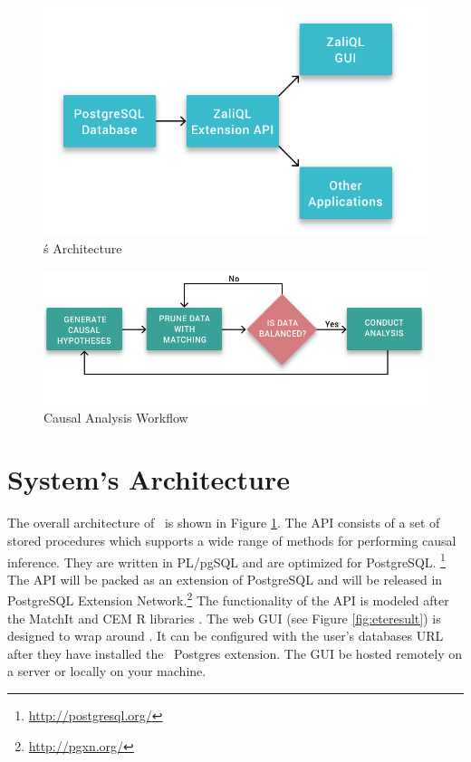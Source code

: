 
\begin{figure}
 \includegraphics[scale=0.25]{Figures/System-Overview.png}
 \caption{\GSQLB\'s Architecture}
  \label{fig:arch}
  \vspace{-3mm}
\end{figure}


\begin{figure}
  \includegraphics[scale=0.25]{Figures/Matching-Flowchart.png}
\caption{Causal Analysis Workflow }
\label{fig:flowchart}
\vspace{-0.3cm}
\end{figure}



\section{System's Architecture}

The overall architecture of \GSQL\ is shown in Figure \ref{fig:arch}.
The API consists of a set of stored procedures which supports a wide range of methods for performing causal inference.  They are written in PL/pgSQL and are optimized for PostgreSQL. \footnote{\url{http://postgresql.org/}}
The API will be packed  as an extension of  PostgreSQL and will be released in
PostgreSQL Extension Network.\footnote{\url{http://pgxn.org/}}
The functionality of the API is modeled after the MatchIt and CEM R libraries \cite{ho2005,iacus2009cem}. The web GUI (see Figure \ref{fig:eteresult}) is designed to wrap around \GSQL. It can be configured with the user's databases URL after they have installed the \GSQL\ Postgres extension. The  GUI be hosted remotely on a server or locally on your machine. 

